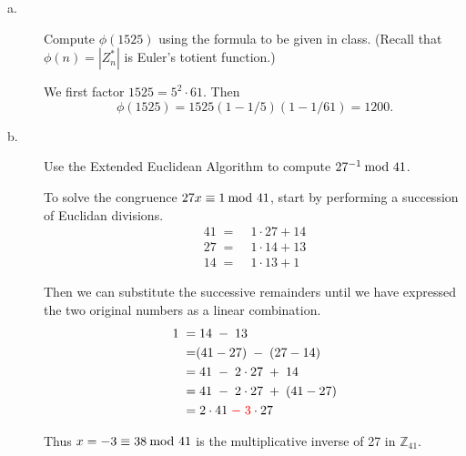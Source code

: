 \documentclass[../hw_sols.tex]{subfiles}
\begin{document}
\begin{description}

\item[a.] Compute $\phi(1525)$ using the formula to be given in class. (Recall 
that $\phi(n) = |Z^*_n|$ is Euler's totient function.)

\begin{solution}
We first factor $1525 = 5^2 \cdot 61$. Then 
	$$\phi(1525) = 1525(1 - 1/5)(1 - 1/61) = 1200.$$
\end{solution}


\item[b.] Use the Extended Euclidean Algorithm to compute $27^{-1} \tmod{41}$.

\begin{solution}

To solve the congruence $27x \equiv 1 \tmod{41}$, start by performing a 
succession of Euclidan divisions.
\begin{align*}
	41 \; =& \; 1 \cdot 27 + 14 \\
	27 \; =& \; 1 \cdot 14 + 13 \\
	14 \; =& \; 1 \cdot 13 + 1
\end{align*}

Then we can substitute the successive remainders until we have expressed the 
two original numbers as a linear combination.
\begin{align*}
	1 \; =& \; 14 \; - \; 13 \\
	=& (41 - 27) \; - \; (27 - 14) \\
	=& \; 41 \; - \; 2 \cdot 27 \; + \; 14 \\
	=& \; 41 \; - \; 2 \cdot 27 \; + \; (41 - 27) \\
	=& \; 2 \cdot 41 \; {\color{red}-} \; {\color{red}3} \cdot 27
\end{align*}

Thus $x = -3 \equiv 38 \tmod{41}$ is the multiplicative inverse of 27 in 
$\mathbb{Z}_{41}$.

\end{solution}

\end{description}


\newpage


\end{document}
